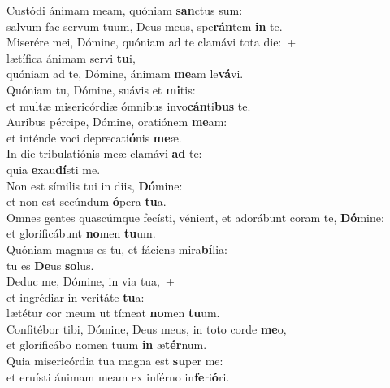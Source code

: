 \evenverse Custódi ánimam meam, quóniam \textbf{san}ctus sum:~\*\\
\evenverse salvum fac servum tuum, Deus meus, spe\textbf{rán}tem \textbf{in} te.\\
\oddverse Miserére mei, Dómine, quóniam ad te clamávi tota die:~+\\
\oddverse  lætífica ánimam servi \textbf{tu}i,~\*\\
\oddverse quóniam ad te, Dómine, ánimam \textbf{me}am le\textbf{vá}vi.\\
\evenverse Quóniam tu, Dómine, suávis et \textbf{mi}tis:~\*\\
\evenverse et multæ misericórdiæ ómnibus invo\textbf{cán}ti\textbf{bus} te.\\
\oddverse Auribus pércipe, Dómine, oratiónem \textbf{me}am:~\*\\
\oddverse et inténde voci deprecati\textbf{ó}nis \textbf{me}æ.\\
\evenverse In die tribulatiónis meæ clamávi \textbf{ad} te:~\*\\
\evenverse quia \textbf{e}xau\textbf{dí}sti me.\\
\oddverse Non est símilis tui in diis, \textbf{Dó}mine:~\*\\
\oddverse et non est secúndum \textbf{ó}pera \textbf{tu}a.\\
\evenverse Omnes gentes quascúmque fecísti, vénient, et adorábunt coram te, \textbf{Dó}mine:~\*\\
\evenverse et glorificábunt \textbf{no}men \textbf{tu}um.\\
\oddverse Quóniam magnus es tu, et fáciens mira\textbf{bí}lia:~\*\\
\oddverse tu es \textbf{De}us \textbf{so}lus.\\
\evenverse Deduc me, Dómine, in via tua,~+\\
\evenverse  et ingrédiar in veritáte \textbf{tu}a:~\*\\
\evenverse lætétur cor meum ut tímeat \textbf{no}men \textbf{tu}um.\\
\oddverse Confitébor tibi, Dómine, Deus meus, in toto corde \textbf{me}o,~\*\\
\oddverse et glorificábo nomen tuum \textbf{in} æ\textbf{tér}num.\\
\evenverse Quia misericórdia tua magna est \textbf{su}per me:~\*\\
\evenverse et eruísti ánimam meam ex inférno in\textbf{fe}ri\textbf{ó}ri.\\
